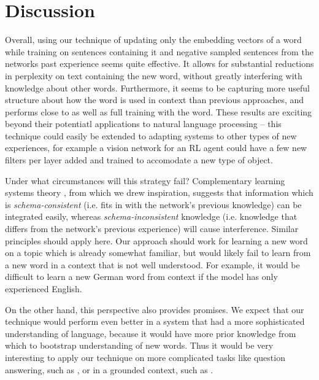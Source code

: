 \documentclass{article}
\begin{document}
\section{Discussion}
Overall, using our technique of updating only the embedding vectors of a word while training on sentences containing it and negative sampled sentences from the networks past experience seems quite effective. It allows for substantial reductions in perplexity on text containing the new word, without greatly interfering with knowledge about other words. Furthermore, it seems to be capturing more useful structure about how the word is used in context than previous approaches, and performs close to as well as full training with the word. These results are exciting beyond their potentiatl applications to natural language processing -- this technique could easily be extended to adapting systems to other types of new experiences, for example a vision network for an RL agent could have a few new filters per layer added and trained to accomodate a new type of object. \par 
Under what circumstances will this strategy fail? Complementary learning systems theory \citep{Kumaran2016}, from which we drew inspiration, suggests that information which is \emph{schema-consistent} (i.e. fits in with the network's previous knowledge) can be integrated easily, whereas \emph{schema-inconsistent} knowledge (i.e. knowledge that differs from the network's previous experience) will cause interference. Similar principles should apply here. Our approach should work for learning a new word on a topic which is already somewhat familiar, but would likely fail to learn from a new word in a context that is not well understood. For example, it would be difficult to learn a new German word from context if the model has only experienced English. \par  
On the other hand, this perspective also provides promises. We expect that our technique would perform even better in a system that had a more sophisticated understanding of language, because it would have more prior knowledge from which to bootstrap understanding of new words. Thus it would be very interesting to apply our technique on more complicated tasks like question answering, such as \citet{Santoro2017}, or in a grounded context, such as \citet{Hermann2017}. \par 
\end{document}
